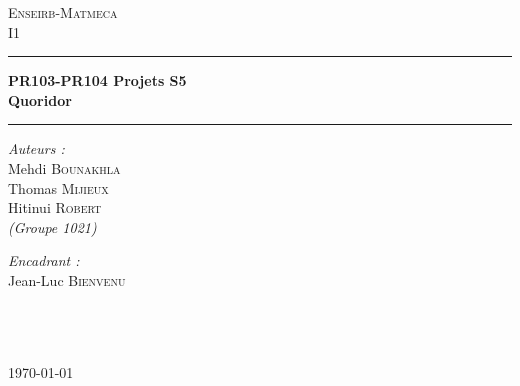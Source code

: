 
\begin{titlepage}
  \begin{center}
    
    \textsc{\large Enseirb-Matmeca\\I1}
    
    \vspace{1.5cm}
    
    \textsc{\Large }
    
    \vspace{0.5cm}
    
    \hrule
    \vspace{1.0cm}
    
    {\LARGE \bfseries PR103-PR104 Projets S5}\\
    \vspace{0.5cm}
    {\LARGE \bfseries Quoridor}

    \vspace{1.0cm}
    \hrule
    
    \vspace{3.0cm}
 
    \begin{minipage}{0.4\textwidth}
      \begin{flushleft} \large
        \emph{Auteurs :}\\
        Mehdi \textsc{Bounakhla}\\
        Thomas \textsc{Mijieux}\\
        Hitinui \textsc{Robert}\\
        \textit{(Groupe 1021)} \\
      \end{flushleft}
    \end{minipage}
    \begin{minipage}{0.4\textwidth}
      \begin{flushright} \large
        \emph{Encadrant :} \\
        Jean-Luc \textsc{Bienvenu}\\
        ~ \\
        ~ \\
        ~ \\
      \end{flushright}
    \end{minipage}

    \vfill
    
    {\large \today}

  \end{center}
\end{titlepage}
